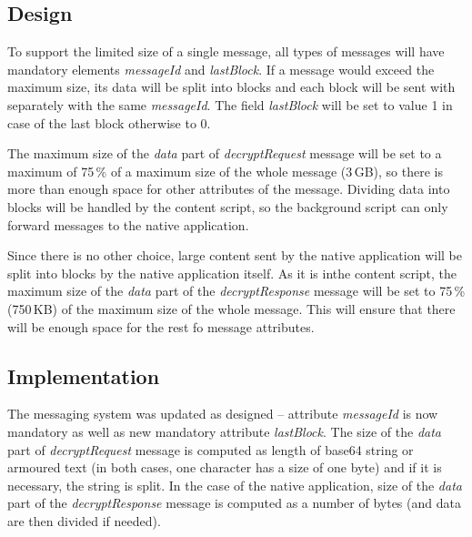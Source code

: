 \subsection{Design}
To support the limited size of a single message, all types of messages will have mandatory elements \textit{messageId} and \textit{lastBlock}. If a message would exceed the maximum size, its data will be split into blocks and each block will be sent with separately with the same \textit{messageId}. The field \textit{lastBlock} will be set to value 1 in case of the last block otherwise to 0.

The maximum size of the \textit{data} part of \textit{decryptRequest} message will be set to a maximum of 75\,\% of a maximum size of the whole message (3\,GB), so there is more than enough space for other attributes of the message. Dividing data into blocks will be handled by the content script, so the background script can only forward messages to the native application.

Since there is no other choice, large content sent by the native application will be split into blocks by the native application itself. As it is inthe  content script, the maximum size of the \textit{data} part of the \textit{decryptResponse} message will be set to 75\,\% (750\,KB) of the maximum size of the whole message. This will ensure that there will be enough space for the rest fo message attributes.

\subsection{Implementation}
The messaging system was updated as designed -- attribute \textit{messageId} is now mandatory as well as new mandatory attribute \textit{lastBlock}. The size of the \textit{data} part of \textit{decryptRequest} message is computed as length of base64 string or armoured text (in both cases, one character has a size of one byte) and if it is necessary, the string is split. In the case of the native application, size of the \textit{data} part of the \textit{decryptResponse} message is computed as a number of bytes (and data are then divided if needed).

